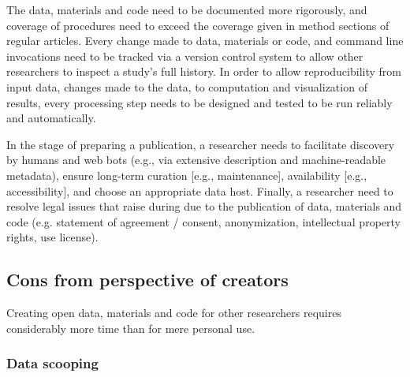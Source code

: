 The data, materials and code need to be documented more rigorously, and coverage
of procedures need to exceed the coverage given in method sections of regular
articles.
%
Every change made to data, materials or code, and command line invocations need
to be tracked via a version control system \citep[e.g.,][]{halchenko2021datalad}
to allow other researchers to inspect a study's full history.
%
In order to allow reproducibility from input data, changes made to the data, to
computation and visualization of results, every processing step needs to be
designed and tested to be run reliably and automatically.

In the stage of preparing a publication, a researcher needs to facilitate
discovery by humans and web bots (e.g., via extensive description and
machine-readable metadata), ensure long-term curation [e.g., maintenance],
availability [e.g., accessibility], and choose an appropriate data host.
Finally, a researcher need to resolve legal issues that raise during due to the
publication of data, materials and code (e.g. statement of agreement / consent,
anonymization, intellectual property rights, use license).


\subsection{Cons from perspective of creators}


%
Creating open data, materials and code for other researchers requires
considerably more time than for mere personal use.


\subsubsection{Data scooping}

